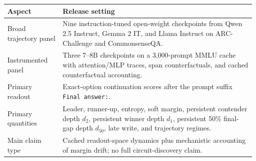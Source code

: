
\begin{tabularx}{\linewidth}{@{}lX@{}}
\toprule
\textbf{Aspect} & \textbf{Release setting}\\
\midrule
Broad trajectory panel & Nine instruction-tuned open-weight checkpoints from Qwen 2.5 Instruct, Gemma 2 IT, and Llama Instruct on ARC-Challenge and CommonsenseQA. \\
Instrumented panel & Three 7--8B checkpoints on a 3,000-prompt MMLU cache with attention/MLP traces, span counterfactuals, and cached counterfactual accounting. \\
Primary readout & Exact-option continuation scores after the prompt suffix \texttt{Final answer:}. \\
Primary quantities & Leader, runner-up, entropy, soft margin, persistent contender depth $d_2$, persistent winner depth $d_1$, persistent 50\% final-gap depth $d_{50}$, late write, and trajectory regimes. \\
Main claim type & Cached readout-space dynamics plus mechanistic accounting of margin drift; no full circuit-discovery claim. \\
\bottomrule
\end{tabularx}
